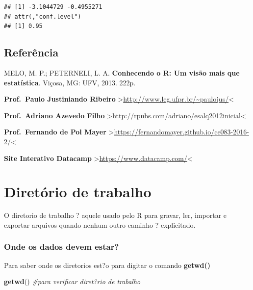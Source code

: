 \documentclass[]{book}
\newenvironment{Shaded}{\begin{snugshade}}{\end{snugshade}}
\newcommand{\CommentTok}[1]{\textcolor[rgb]{0.56,0.35,0.01}{\textit{#1}}}
\newcommand{\KeywordTok}[1]{\textcolor[rgb]{0.13,0.29,0.53}{\textbf{#1}}}
\newcommand{\NormalTok}[1]{#1}
\newcommand{\OperatorTok}[1]{\textcolor[rgb]{0.81,0.36,0.00}{\textbf{#1}}}
\begin{document}
\begin{Shaded}
\end{Shaded}

\begin{verbatim}
## [1] -3.1044729 -0.4955271
## attr(,"conf.level")
## [1] 0.95
\end{verbatim}

\hypertarget{referencia-1}{%
\section{Referência}\label{referencia-1}}

MELO, M. P.; PETERNELI, L. A. \textbf{Conhecendo o R: Um visão mais que estatística}. Viçosa, MG: UFV, 2013. 222p.

\textbf{Prof.~Paulo Justiniando Ribeiro} \textgreater{}\url{http://www.leg.ufpr.br/~paulojus/}\textless{}

\textbf{Prof.~Adriano Azevedo Filho} \textgreater{}\url{http://rpubs.com/adriano/esalq2012inicial}\textless{}

\textbf{Prof.~Fernando de Pol Mayer} \textgreater{}\url{https://fernandomayer.github.io/ce083-2016-2/}\textless{}

\textbf{Site Interativo Datacamp} \textgreater{}\url{https://www.datacamp.com/}\textless{}

\hypertarget{diretorio-de-trabalho}{%
\chapter{Diretório de trabalho}\label{diretorio-de-trabalho}}

O diretorio de trabalho ? aquele usado pelo R para gravar, ler, importar e exportar arquivos quando nenhum outro caminho ? explicitado.

\hypertarget{onde-os-dados-devem-estar}{%
\subsection{Onde os dados devem estar?}\label{onde-os-dados-devem-estar}}

Para saber onde os diretorios est?o para digitar o comando \textbf{getwd()}

\begin{Shaded}
\begin{Highlighting}[]
 \KeywordTok{getwd}\NormalTok{() }\CommentTok{#para verificar  diret?rio de trabalho}
\end{Highlighting}
\end{Shaded}
\end{document}

